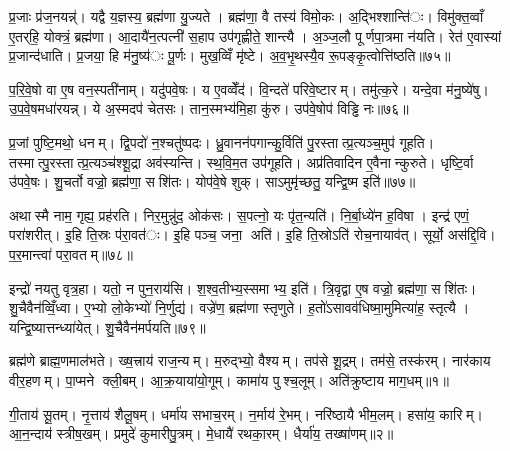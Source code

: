 प्र॒जाः प्र॑ज॒नयन्न्॑। यद्वै य॒ज्ञस्य॒ ब्रह्म॑णा यु॒ज्यते। ब्रह्म॑णा॒ वै तस्य॑ विमो॒कः। अ॒द्भिश्शान्ति॑ः। विमु॑क्त॒व्वाँ ए॒तर्‌हि॒ योक्त्रं॒ ब्रह्म॑णा। आ॒दायै॑न॒त्पत्नी॑ स॒हाप उप॑गृह्णीते॒ शान्त्यै। अ॒ञ्ज॒लौ पूर्णपा॒त्रमा न॑यति। रेत॑ ए॒वास्यां प्र॒जान्द॑धाति। प्र॒जया॒ हि म॑नु॒ष्य॑ः पू॒र्णः। मुख॒व्विँ मृ॑ष्टे। अ॒व॒भृ॒थस्यै॒व रू॒पङ्कृ॒त्वोत्ति॑ष्ठति॥७५॥


प॒रि॒वे॒षो वा ए॒ष वन॒स्पती॑नाम्। यदु॑पवे॒षः। य ए॒वव्वेँद॑। वि॒न्दते॑ परिवे॒ष्टारम्। तमु॑त्क॒रे। यन्दे॒वा म॑नु॒ष्ये॑षु। उ॒प॒वे॒षमधा॑रयन्न्। ये अ॒स्मदप॑ चेतसः। तान॒स्मभ्य॑मि॒हा कु॑रु। उप॑वे॒षोप॑ विड्ढि नः॥७६॥

प्र॒जां पुष्टि॒मथो॒ धनम्। द्वि॒पदो॑ न॒श्चतु॑ष्पदः। ध्रु॒वानन॑पगान्कु॒र्विति॑ पु॒रस्तात्प्र॒त्यञ्च॒मुप॑ गूहति। तस्मात्पु॒रस्तात्प्र॒त्यञ्च॑श्शू॒द्रा अव॑स्यन्ति। स्थ॒वि॒म॒त उप॑गूहति। अप्र॑तिवादिन ए॒वैनान्कुरुते। धृष्टि॒र्वा उ॑पवे॒षः। शु॒चर्तो वज्रो॒ ब्रह्म॑णा॒ सशि॑तः। योप॑वे॒षे शुक्। साऽमुमृ॑च्छतु॒ यन्द्वि॒ष्म इति॑॥७७॥

अथास्मै नाम॒ गृह्य॒ प्रह॑रति। निर॒मुन्नु॑द॒ ओक॑सः। स॒पत्नो॒ यः पृ॑त॒न्यति॑। नि॒र्बा॒ध्ये॑न ह॒विषा। इन्द्र॑ एणं॒ परा॑शरीत्। इ॒हि ति॒स्रः प॑रा॒वत॑ः। इ॒हि पञ्च॒ जना॒ अति॑। इ॒हि ति॒स्रोऽति॑ रोच॒नायाव॑त्। सूर्यो॒ अस॑द्दि॒वि। प॒र॒मान्त्वा॑ परा॒वतम्॥७८॥

इन्द्रो॑ नयतु वृत्र॒हा। यतो॒ न पुन॒राय॑सि। श॒श्व॒तीभ्य॒स्समाभ्य॒ इति॑। त्रि॒वृद्वा ए॒ष वज्रो॒ ब्रह्म॑णा॒ सशि॑तः। शु॒चैवैन॑व्विँ॒ध्वा। ए॒भ्यो लो॒केभ्यो॑ नि॒र्णुद्य॑। वज्रे॑ण॒ ब्रह्म॑णा स्तृणुते। ह॒तो॑ऽसावव॑धिष्मा॒मुमित्या॑ह॒ स्तृत्यै। यन्द्वि॒ष्यात्तन्ध्या॑येत्। शु॒चैवैन॑मर्पयति॥७९॥



ब्रह्म॑णे ब्राह्म॒णमाल॑भते। ख्ष॒त्त्राय॑ राज॒न्यम्। म॒रुद्भ्यो॒ वैश्यम्। तप॑से शू॒द्रम्। तम॑से॒ तस्क॑रम्। नार॑काय वीर॒हणम्। पा॒प्मने क्ली॒बम्। आ॒क्र॒याया॑यो॒गूम्। कामा॑य पुश्च॒लूम्। अति॑क्रुष्टाय माग॒धम्॥१॥

गी॒ताय॑ सू॒तम्। नृ॒त्ताय॑ शैलू॒षम्। धर्मा॑य सभाच॒रम्। न॒र्माय॑ रे॒भम्। नरि॑ष्ठायै भीम॒लम्। हसा॑य॒ कारिम्। आ॒न॒न्दाय॑ स्त्रीष॒खम्। प्रमुदे॑ कुमारीपु॒त्रम्। मे॒धायै॑ रथका॒रम्। धैर्या॑य॒ तख्षा॑णम्॥२॥

